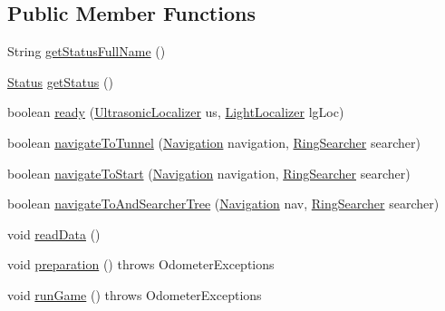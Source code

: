 \subsection*{Public Member Functions}
\begin{DoxyCompactItemize}
\item 
String \hyperlink{enumca_1_1mcgill_1_1ecse211_1_1project_1_1_game_a43a5763d183e0bcacd402c872c07273e}{get\+Status\+Full\+Name} ()
\item 
\hyperlink{enumca_1_1mcgill_1_1ecse211_1_1project_1_1_game_1_1_status}{Status} \hyperlink{enumca_1_1mcgill_1_1ecse211_1_1project_1_1_game_a620374b3eeb3dd7e0abd26f3ced9053b}{get\+Status} ()
\item 
boolean \hyperlink{enumca_1_1mcgill_1_1ecse211_1_1project_1_1_game_a5b304a6a59ddee3f8c7d37bba8a4c129}{ready} (\hyperlink{classca_1_1mcgill_1_1ecse211_1_1localization_1_1_ultrasonic_localizer}{Ultrasonic\+Localizer} us, \hyperlink{classca_1_1mcgill_1_1ecse211_1_1localization_1_1_light_localizer}{Light\+Localizer} lg\+Loc)
\item 
boolean \hyperlink{enumca_1_1mcgill_1_1ecse211_1_1project_1_1_game_ad3d03cffa33c927317d8fcba0c928a24}{navigate\+To\+Tunnel} (\hyperlink{classca_1_1mcgill_1_1ecse211_1_1project_1_1_navigation}{Navigation} navigation, \hyperlink{classca_1_1mcgill_1_1ecse211_1_1threads_1_1_ring_searcher}{Ring\+Searcher} searcher)
\item 
boolean \hyperlink{enumca_1_1mcgill_1_1ecse211_1_1project_1_1_game_aa9d873f6cd4ef177c1622c24f72b0e0a}{navigate\+To\+Start} (\hyperlink{classca_1_1mcgill_1_1ecse211_1_1project_1_1_navigation}{Navigation} navigation, \hyperlink{classca_1_1mcgill_1_1ecse211_1_1threads_1_1_ring_searcher}{Ring\+Searcher} searcher)
\item 
boolean \hyperlink{enumca_1_1mcgill_1_1ecse211_1_1project_1_1_game_a623ef585f41a45d778590392314ea352}{navigate\+To\+And\+Searcher\+Tree} (\hyperlink{classca_1_1mcgill_1_1ecse211_1_1project_1_1_navigation}{Navigation} nav, \hyperlink{classca_1_1mcgill_1_1ecse211_1_1threads_1_1_ring_searcher}{Ring\+Searcher} searcher)
\item 
void \hyperlink{enumca_1_1mcgill_1_1ecse211_1_1project_1_1_game_a032b53e9b16b9d470b461de4a311a698}{read\+Data} ()
\item 
void \hyperlink{enumca_1_1mcgill_1_1ecse211_1_1project_1_1_game_a8f3c5b18f98ee56f5f03afd72fa40bcb}{preparation} ()  throws Odometer\+Exceptions 
\item 
void \hyperlink{enumca_1_1mcgill_1_1ecse211_1_1project_1_1_game_adf69abe44e952d627fb9e6a2f678cb5e}{run\+Game} ()  throws Odometer\+Exceptions 
\end{DoxyCompactItemize}
